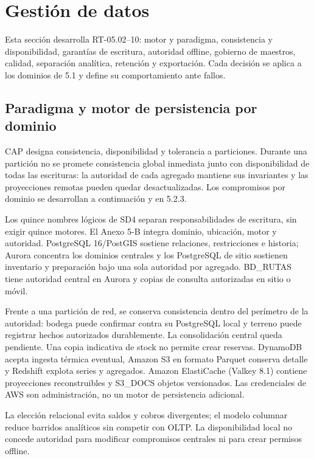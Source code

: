 \section{Gestión de datos}
\label{sec:sd5-5-2}

Esta sección desarrolla RT-05.02–10: motor y paradigma, consistencia y disponibilidad, garantías de escritura, autoridad offline, gobierno de maestros, calidad, separación analítica, retención y exportación. Cada decisión se aplica a los dominios de 5.1 y define su comportamiento ante fallos.

\subsection{Paradigma y motor de persistencia por dominio}
\label{sec:sd5-5-2-1}

CAP designa consistencia, disponibilidad y tolerancia a particiones. Durante una partición no se promete consistencia global inmediata junto con disponibilidad de todas las escrituras: la autoridad de cada agregado mantiene sus invariantes y las proyecciones remotas pueden quedar desactualizadas. Los compromisos por dominio se desarrollan a continuación y en 5.2.3.

Los quince nombres lógicos de SD4 separan responsabilidades de escritura, sin exigir quince motores. El Anexo 5-B integra dominio, ubicación, motor y autoridad. PostgreSQL 16/PostGIS sostiene relaciones, restricciones e historia; Aurora concentra los dominios centrales y los PostgreSQL de sitio sostienen inventario y preparación bajo una sola autoridad por agregado. BD\_RUTAS tiene autoridad central en Aurora y copias de consulta autorizadas en sitio o móvil.

Frente a una partición de red, se conserva consistencia dentro del perímetro de la autoridad: bodega puede confirmar contra su PostgreSQL local y terreno puede registrar hechos autorizados durablemente. La consolidación central queda pendiente. Una copia indicativa de stock no permite crear reservas. DynamoDB acepta ingesta térmica eventual, Amazon S3 en formato Parquet conserva detalle y Redshift explota series y agregados. Amazon ElastiCache (Valkey 8.1) contiene proyecciones reconstruibles y S3\_DOCS objetos versionados. Las credenciales de AWS son administración, no un motor de persistencia adicional.

La elección relacional evita saldos y cobros divergentes; el modelo columnar reduce barridos analíticos sin competir con OLTP. La disponibilidad local no concede autoridad para modificar compromisos centrales ni para crear permisos offline.

